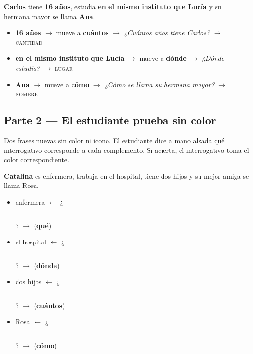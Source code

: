 \documentclass[a4paper,10pt]{article}
\begin{document}
\vspace{0.15cm}

\noindent\textbf{Carlos} tiene \textcolor{morado}{\textbf{16 años}}, estudia \textcolor{verde}{\textbf{en el mismo instituto que Lucía}} y su hermana mayor se llama \textcolor{colornaranja}{\textbf{Ana}}.

\vspace{0.1cm}

\begin{itemize}[leftmargin=1cm, itemsep=1pt]
\item \textcolor{morado}{\textbf{16 años}} $\to$ mueve a \textbf{cuántos} $\to$ \textit{¿Cuántos años tiene Carlos?} $\to$ \textsc{cantidad}
\item \textcolor{verde}{\textbf{en el mismo instituto que Lucía}} $\to$ mueve a \textbf{dónde} $\to$ \textit{¿Dónde estudia?} $\to$ \textsc{lugar}
\item \textcolor{colornaranja}{\textbf{Ana}} $\to$ mueve a \textbf{cómo} $\to$ \textit{¿Cómo se llama su hermana mayor?} $\to$ \textsc{nombre}
\end{itemize}

\vspace{0.4cm}

\subsection*{\textcolor{naranja}{Parte 2 --- El estudiante prueba sin color}}

{\small Dos frases nuevas sin color ni icono. El estudiante dice a mano alzada qué interrogativo corresponde a cada complemento. Si acierta, el interrogativo toma el color correspondiente.}

\vspace{0.2cm}

\noindent\textbf{Catalina} es enfermera, trabaja en el hospital, tiene dos hijos y su mejor amiga se llama Rosa.

\begin{itemize}[leftmargin=1cm, itemsep=1pt]
\item enfermera $\leftarrow$ ¿\rule{1.5cm}{0.4pt}? $\to$ (\textbf{qué})
\item el hospital $\leftarrow$ ¿\rule{1.5cm}{0.4pt}? $\to$ (\textbf{dónde})
\item dos hijos $\leftarrow$ ¿\rule{1.5cm}{0.4pt}? $\to$ (\textbf{cuántos})
\item Rosa $\leftarrow$ ¿\rule{1.5cm}{0.4pt}? $\to$ (\textbf{cómo})
\end{itemize}
\end{document}
